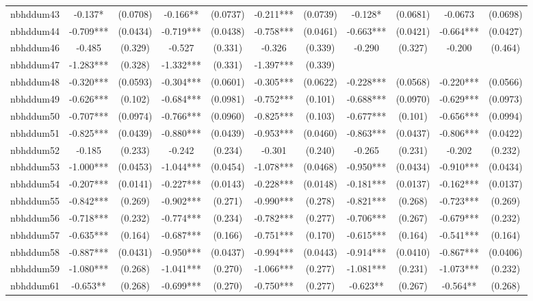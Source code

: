 \documentclass[]{article}
\begin{document}
\begin{tabular}{lcccccccccc}
nbhddum43 & -0.137* & (0.0708) & -0.166** & (0.0737) & -0.211*** & (0.0739) & -0.128* & (0.0681) & -0.0673 & (0.0698) \\
nbhddum44 & -0.709*** & (0.0434) & -0.719*** & (0.0438) & -0.758*** & (0.0461) & -0.663*** & (0.0421) & -0.664*** & (0.0427) \\
nbhddum46 & -0.485 & (0.329) & -0.527 & (0.331) & -0.326 & (0.339) & -0.290 & (0.327) & -0.200 & (0.464) \\
nbhddum47 & -1.283*** & (0.328) & -1.332*** & (0.331) & -1.397*** & (0.339) &  &  &  &  \\
nbhddum48 & -0.320*** & (0.0593) & -0.304*** & (0.0601) & -0.305*** & (0.0622) & -0.228*** & (0.0568) & -0.220*** & (0.0566) \\
nbhddum49 & -0.626*** & (0.102) & -0.684*** & (0.0981) & -0.752*** & (0.101) & -0.688*** & (0.0970) & -0.629*** & (0.0973) \\
nbhddum50 & -0.707*** & (0.0974) & -0.766*** & (0.0960) & -0.825*** & (0.103) & -0.677*** & (0.101) & -0.656*** & (0.0994) \\
nbhddum51 & -0.825*** & (0.0439) & -0.880*** & (0.0439) & -0.953*** & (0.0460) & -0.863*** & (0.0437) & -0.806*** & (0.0422) \\
nbhddum52 & -0.185 & (0.233) & -0.242 & (0.234) & -0.301 & (0.240) & -0.265 & (0.231) & -0.202 & (0.232) \\
nbhddum53 & -1.000*** & (0.0453) & -1.044*** & (0.0454) & -1.078*** & (0.0468) & -0.950*** & (0.0434) & -0.910*** & (0.0434) \\
nbhddum54 & -0.207*** & (0.0141) & -0.227*** & (0.0143) & -0.228*** & (0.0148) & -0.181*** & (0.0137) & -0.162*** & (0.0137) \\
nbhddum55 & -0.842*** & (0.269) & -0.902*** & (0.271) & -0.990*** & (0.278) & -0.821*** & (0.268) & -0.723*** & (0.269) \\
nbhddum56 & -0.718*** & (0.232) & -0.774*** & (0.234) & -0.782*** & (0.277) & -0.706*** & (0.267) & -0.679*** & (0.232) \\
nbhddum57 & -0.635*** & (0.164) & -0.687*** & (0.166) & -0.751*** & (0.170) & -0.615*** & (0.164) & -0.541*** & (0.164) \\
nbhddum58 & -0.887*** & (0.0431) & -0.950*** & (0.0437) & -0.994*** & (0.0443) & -0.914*** & (0.0410) & -0.867*** & (0.0406) \\
nbhddum59 & -1.080*** & (0.268) & -1.041*** & (0.270) & -1.066*** & (0.277) & -1.081*** & (0.231) & -1.073*** & (0.232) \\
nbhddum61 & -0.653** & (0.268) & -0.699*** & (0.270) & -0.750*** & (0.277) & -0.623** & (0.267) & -0.564** & (0.268) \\

\end{tabular}
\end{document}
